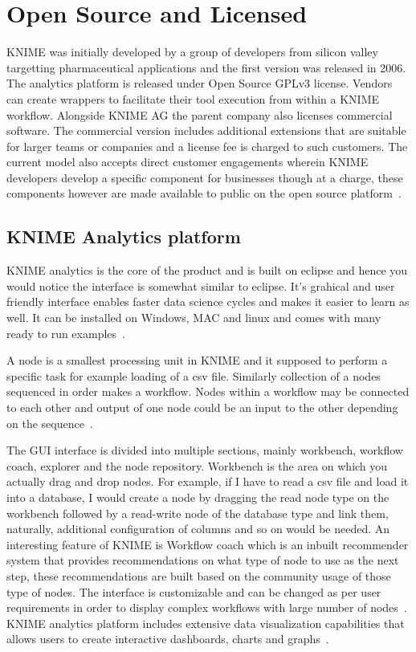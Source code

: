 \section{Open Source and Licensed}
KNIME was initially developed by a group of developers from silicon valley targetting
pharmaceutical applications and the first version was released in 2006. The analytics 
platform is released under Open Source GPLv3 license. Vendors can create wrappers 
to facilitate their tool execution from within a KNIME workflow.
Alongside KNIME AG the parent company also licenses commercial software. The 
commercial version includes additional extensions that are suitable for larger teams or companies
and a license fee is charged to such customers. The current model also accepts direct customer 
engagements wherein KNIME developers develop a specific component for businesses though 
at a charge, these components however are made available to public on the open source platform~\cite{hid-sp18-517-opensource}.

\subsection{KNIME Analytics platform}
KNIME analytics is the core of the product and is built on eclipse and hence you
would notice the interface is somewhat similar to eclipse. It's grahical and
user friendly interface enables faster data science cycles and makes it easier
to learn as well. It can be installed on Windows, MAC and linux and comes with
many ready to run examples~\cite{hid-sp18-517-kap}.

A node is a smallest processing unit in KNIME and it supposed to perform a
specific task for example loading of a csv file. Similarly collection of a nodes
sequenced in order makes a workflow. Nodes within a workflow may be connected to
each other and output of one node could be an input to the other depending on
the sequence~\cite{hid-sp18-517-kintro}.

The GUI interface is divided into multiple sections, mainly workbench, workflow
coach, explorer and the node repository. Workbench is the area on which you
actually drag and drop nodes. For example, if I have to read a csv file and load
it into a database, I would create a node by dragging the read node type on the
workbench followed by a read-write node of the database type and link them,
naturally, additional configuration of columns and so on would be needed.  An
interesting feature of KNIME is Workflow coach which is an inbuilt recommender
system that provides recommendations on what type of node to use as the next
step, these recommendations are built based on the community usage of those type
of nodes. The interface is customizable and can be changed as per user
requirements in order to display complex workflows with large number of
nodes~\cite{hid-sp18-517-ch1sec1}.  KNIME analytics platform includes extensive
data visualization capabilities that allows users to create interactive
dashboards, charts and graphs~\cite{hid-sp18-517-ch5}.

